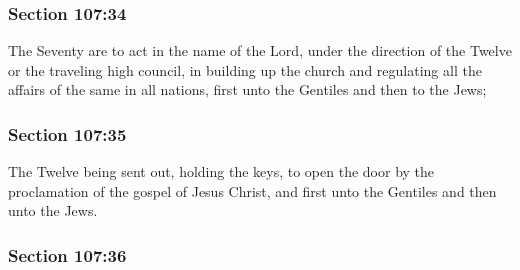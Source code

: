 
	\subsubsection{Section 107:34} %
		\label{DC107-34}

		The Seventy are to act in the name of the Lord, under the direction of the Twelve or the traveling high council, in building up the church and regulating all the affairs of the same in all nations, first unto the Gentiles and then to the Jews;


	\subsubsection{Section 107:35} %
		\label{DC107-35}

		The Twelve being sent out, holding the keys, to open the door by the proclamation of the gospel of Jesus Christ, and first unto the Gentiles and then unto the Jews.


	\subsubsection{Section 107:36} %
		\label{DC107-36}

